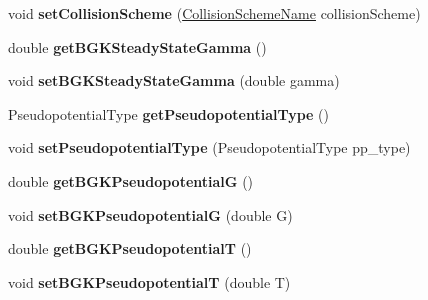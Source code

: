 \begin{DoxyCompactItemize}
\item 
\hypertarget{classnatrium_1_1SolverConfiguration_a5e7241337aa70cbe4b8af29c9cb5cfe8}{
void {\bfseries setCollisionScheme} (\hyperlink{namespacenatrium_a77a27ea835db291372b246db6b4b1578}{CollisionSchemeName} collisionScheme)}
\label{classnatrium_1_1SolverConfiguration_a5e7241337aa70cbe4b8af29c9cb5cfe8}

\item 
\hypertarget{classnatrium_1_1SolverConfiguration_a4ebcfcb30f5cb6efb0d9fb3978b9b90f}{
double {\bfseries getBGKSteadyStateGamma} ()}
\label{classnatrium_1_1SolverConfiguration_a4ebcfcb30f5cb6efb0d9fb3978b9b90f}

\item 
\hypertarget{classnatrium_1_1SolverConfiguration_a040a4e68a3ce9502e39deb343586d62b}{
void {\bfseries setBGKSteadyStateGamma} (double gamma)}
\label{classnatrium_1_1SolverConfiguration_a040a4e68a3ce9502e39deb343586d62b}

\item 
\hypertarget{classnatrium_1_1SolverConfiguration_abd8ff897c0b83035faaa42853692114d}{
PseudopotentialType {\bfseries getPseudopotentialType} ()}
\label{classnatrium_1_1SolverConfiguration_abd8ff897c0b83035faaa42853692114d}

\item 
\hypertarget{classnatrium_1_1SolverConfiguration_a86fc0a490ecda4f46fc2d83ed7d22168}{
void {\bfseries setPseudopotentialType} (PseudopotentialType pp\_\-type)}
\label{classnatrium_1_1SolverConfiguration_a86fc0a490ecda4f46fc2d83ed7d22168}

\item 
\hypertarget{classnatrium_1_1SolverConfiguration_a183655b5e39571c408c28ed2b94cb49b}{
double {\bfseries getBGKPseudopotentialG} ()}
\label{classnatrium_1_1SolverConfiguration_a183655b5e39571c408c28ed2b94cb49b}

\item 
\hypertarget{classnatrium_1_1SolverConfiguration_aaa116d79971339eeb78dcd8b9f557628}{
void {\bfseries setBGKPseudopotentialG} (double G)}
\label{classnatrium_1_1SolverConfiguration_aaa116d79971339eeb78dcd8b9f557628}

\item 
\hypertarget{classnatrium_1_1SolverConfiguration_ac783bdeec57a5344b795eee009e1617a}{
double {\bfseries getBGKPseudopotentialT} ()}
\label{classnatrium_1_1SolverConfiguration_ac783bdeec57a5344b795eee009e1617a}

\item 
\hypertarget{classnatrium_1_1SolverConfiguration_ac02282d442294c957bbb0481cebd085f}{
void {\bfseries setBGKPseudopotentialT} (double T)}
\label{classnatrium_1_1SolverConfiguration_ac02282d442294c957bbb0481cebd085f}


\end{DoxyCompactItemize}
